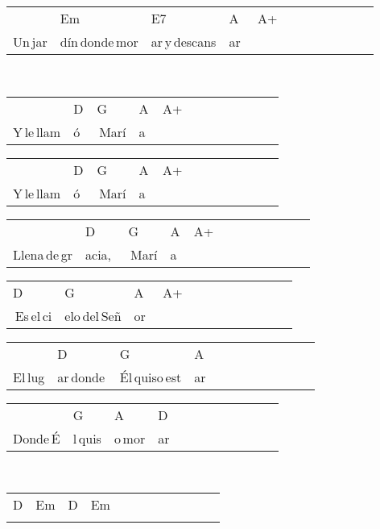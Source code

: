 \begin{multicols}{2}
\begin{minipage}{\columnwidth}
\noindent
\begin{tabular}{llllllllllll}
&Em&E7&A&A+\\
Un\,jar&dín\,donde\,mor&ar\,y\,descans&ar\,\,&
\end{tabular}
\end{minipage}\\

\noindent
\begin{minipage}{\columnwidth}
\noindent
\noindent
\begin{tabular}{llllllllllll}
&D&G&A&A+\\
Y\,le\,llam&ó\,\,&\,Marí&a\,\,&
\end{tabular}

\noindent
\begin{tabular}{llllllllllll}
&D&G&A&A+\\
Y\,le\,llam&ó\,\,&\,Marí&a\,\,&
\end{tabular}

\noindent
\begin{tabular}{llllllllllll}
&D&G&A&A+\\
Llena\,de\,gr&acia,\,\,&\,Marí&a\,\,&
\end{tabular}

\noindent
\begin{tabular}{llllllllllll}
D&G&A&A+\\
\,Es\,el\,ci&elo\,del\,Señ&or\,\,&
\end{tabular}

\noindent
\begin{tabular}{llllllllllll}
&D&G&A\\
El\,lug&ar\,donde\,&Él\,quiso\,est&ar
\end{tabular}

\noindent
\begin{tabular}{llllllllllll}
&G&A&D\\
Donde\,É&l\,quis&o\,mor&ar
\end{tabular}
\end{minipage}\\

\noindent
\begin{minipage}{\columnwidth}
\noindent
\noindent
\begin{tabular}{llllllllllll}
D&Em&D&Em\\
\quad\quad&\quad\quad&\quad\quad&
\end{tabular}
\end{minipage}\\


\end{multicols}

